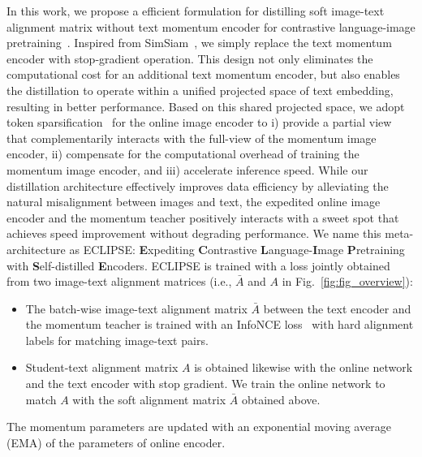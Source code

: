 In this work, we propose a efficient formulation for distilling soft image-text alignment matrix without text momentum encoder for contrastive language-image pretraining~\cite{jia2021scaling,radford2021learning}.
Inspired from SimSiam~\cite{chen2021exploring}, we simply replace the text momentum encoder with stop-gradient operation.
This design not only eliminates the computational cost for an additional text momentum encoder, but also enables the distillation to operate within a unified projected space of text embedding, resulting in better performance.
Based on this shared projected space, we adopt token sparsification~\cite{liang2022evit} for the online image encoder to i) provide a partial view that complementarily interacts with the full-view of the momentum image encoder, ii) compensate for the computational overhead of training the momentum image encoder, and iii) accelerate inference speed.
While our distillation architecture effectively improves data efficiency by alleviating the natural misalignment between images and text, the expedited online image encoder and the momentum teacher positively interacts with a sweet spot that achieves speed improvement without degrading performance.
We name this meta-architecture as ECLIPSE: \textbf{E}xpediting \textbf{C}ontrastive \textbf{L}anguage-\textbf{I}mage \textbf{P}retraining with \textbf{S}elf-distilled \textbf{E}ncoders.
ECLIPSE is trained with a loss jointly obtained from two image-text alignment matrices (i.e., $\bar{A}$ and $A$ in Fig.~\ref{fig:fig_overview}):
\begin{itemize}
    \item The batch-wise image-text alignment matrix $\bar{A}$ between the text encoder and the momentum teacher is trained with an InfoNCE loss~\cite{oord2018representation} with hard alignment labels for matching image-text pairs.
    
    \item Student-text alignment matrix $A$ is obtained likewise with the online network and the text encoder with stop gradient. We train the online network to match $A$ with the soft alignment matrix $\bar{A}$ obtained above.
\end{itemize}
The momentum parameters are updated with an exponential moving average (EMA) of the parameters of online encoder.

